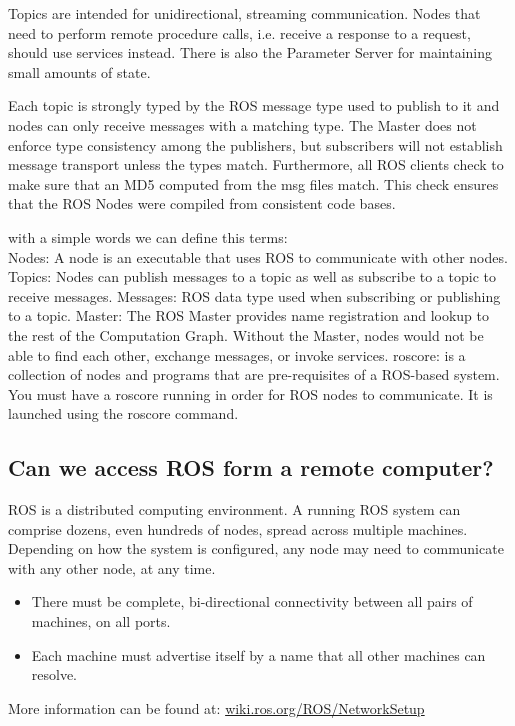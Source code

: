 	Topics are intended for unidirectional, streaming communication. Nodes that need to perform remote procedure calls, i.e. receive a response to a request, should use services instead. There is also the Parameter Server for maintaining small amounts of state.
	
	Each topic is strongly typed by the ROS message type used to publish to it and nodes can only receive messages with a matching type. The Master does not enforce type consistency among the publishers, but subscribers will not establish message transport unless the types match. Furthermore, all ROS clients check to make sure that an MD5 computed from the msg files match. This check ensures that the ROS Nodes were compiled from consistent code bases.
	
	with a simple words we can define this terms:\\
	
	Nodes: A node is an executable that uses ROS to communicate with other nodes.
	Topics: Nodes can publish messages to a topic as well as subscribe to a topic to receive messages.
	Messages: ROS data type used when subscribing or publishing to a topic.
	Master: The ROS Master provides name registration and lookup to the rest of the Computation Graph. Without the Master, nodes would not be able to find each other, exchange messages, or invoke services.
	roscore: is a collection of nodes and programs that are pre-requisites of a ROS-based system. You must have a roscore running in order for ROS nodes to communicate. It is launched using the roscore command.
	
	

\subsection{Can we access ROS form a remote computer?}
	ROS is a distributed computing environment. A running ROS system can comprise dozens, even hundreds of nodes, spread across multiple machines. Depending on how the system is configured, any node may need to communicate with any other node, at any time.	
	\begin{itemize}
		\item There must be complete, bi-directional connectivity between all pairs of machines, on all ports.
		\item Each machine must advertise itself by a name that all other machines can resolve.
	\end{itemize}

More information can be found at:  \url{wiki.ros.org/ROS/NetworkSetup}

